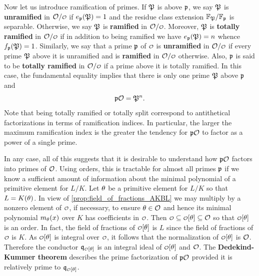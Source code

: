     Now let us introduce ramification of primes. If \(\mathfrak{P}\) is above \(\mathfrak{p}\), we say \(\mathfrak{P}\) is \textbf{unramified} in \(\mc{O}/\smc{O}\) if \(e_{\mathfrak{p}}(\mathfrak{P}) = 1\) and the residue class extension \(\mathbb{F}_{\mathfrak{P}}/\mathbb{F}_{\mathfrak{p}}\) is separable. Otherwise, we say \(\mathfrak{P}\) is \textbf{ramified} in \(\mc{O}/\smc{O}\). Moreover, \(\mathfrak{P}\) is \textbf{totally ramified} in \(\mc{O}/\smc{O}\) if in addition to being ramified we have \(e_{\mathfrak{p}}(\mathfrak{P}) = n\) whence \(f_{\mathfrak{p}}(\mathfrak{P}) = 1\). Similarly, we say that a prime \(\mathfrak{p}\) of \(\smc{O}\) is \textbf{unramified} in \(\mc{O}/\smc{O}\) if every prime \(\mathfrak{P}\) above it is unramified and is \textbf{ramified} in \(\mc{O}/\smc{O}\) otherwise. Also, \(\mathfrak{p}\) is said to be \textbf{totally ramified} in \(\mc{O}/\smc{O}\) if a prime above it is totally ramified. In this case, the fundamental equality implies that there is only one prime \(\mathfrak{P}\) above \(\mathfrak{p}\) and
    \[
      \mathfrak{p}\mathcal{O} = \mathfrak{P}^{n}.
    \]
    Note that being totally ramified or totally split correspond to antithetical factorizations in terms of ramification indices. In particular, the larger the maximum ramification index is the greater the tendency for \(\mathfrak{p}\mathcal{O}\) to factor as a power of a single prime.

    In any case, all of this suggests that it is desirable to understand how \(\mathfrak{p}\mathcal{O}\) factors into primes of \(\mathcal{O}\). Using orders, this is tractable for almost all primes \(\mathfrak{p}\) if we know a sufficient amount of information about the minimal polynomial of a primitive element for \(L/K\). Let \(\theta\) be a primitive element for \(L/K\) so that \(L = K(\theta)\). In view of \cref{prop:field_of_fractions_AKBL} we may multiply by a nonzero element of \(\smc{O}\), if necessary, to ensure \(\theta \in \mathcal{O}\) and hence its minimal polynomial \(m_{\theta}(x)\) over \(K\) has coefficients in \(\smc{O}\). Then \(\smc{O} \subseteq \smc{O}[\t] \subseteq \mc{O}\) so that \(\smc{O}[\t]\) is an order. In fact, the field of fractions of \(\smc{O}[\t]\) is \(L\) since the field of fractions of \(\smc{O}\) is \(K\). As \(\smc{O}[\t]\) is integral over \(\smc{O}\), it follows that the normalization of \(\smc{O}[\t]\) is \(\mathcal{O}\). Therefore the conductor \(\mf{q}_{\smc{O}[\t]}\) is an integral ideal of \(\smc{O}[\t]\) and \(\mathcal{O}\). The \textbf{Dedekind-Kummer theorem} describes the prime factorization of \(\mathfrak{p}\mathcal{O}\) provided it is relatively prime to \(\mf{q}_{\smc{O}[\t]}\).

